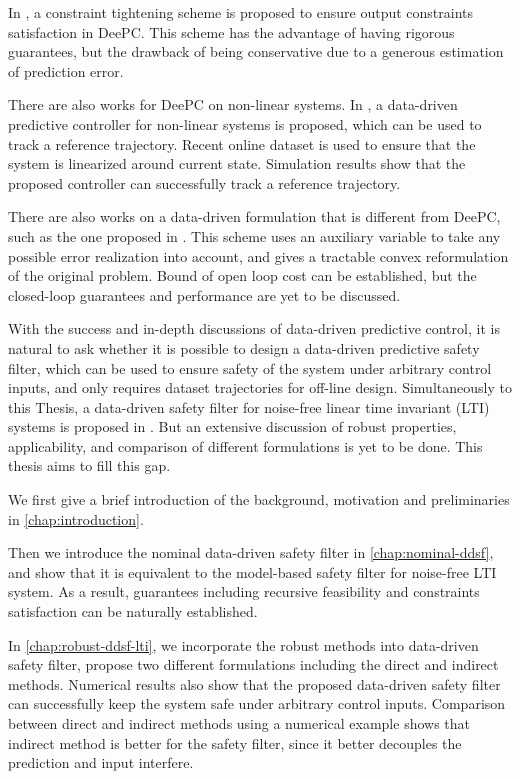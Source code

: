 In \cite{berberichRobustConstraintSatisfaction2020}, a constraint tightening scheme is proposed to ensure output constraints satisfaction in DeePC.
This scheme has the advantage of having rigorous guarantees, but the drawback of being conservative due to a generous estimation of prediction error.

There are also works for DeePC on non-linear systems.
In \cite{berberichLinearTrackingMPCData2022}, a data-driven predictive controller for non-linear systems is proposed, which can be used to track a reference trajectory.
Recent online dataset is used to ensure that the system is linearized around current state.
Simulation results show that the proposed controller can successfully track a reference trajectory.

There are also works on a data-driven formulation that is different from DeePC, such as the one proposed in \cite{huangRobustDataEnabledPredictive2023}.
This scheme uses an auxiliary variable to take any possible error realization into account, and gives a tractable convex reformulation of the original problem.
Bound of open loop cost can be established, but the closed-loop guarantees and performance are yet to be discussed.

With the success and in-depth discussions of data-driven predictive control, it is natural to ask whether it is possible to design a data-driven predictive safety filter, which can be used to ensure safety of the system under arbitrary control inputs, and only requires dataset trajectories for off-line design.
Simultaneously to this Thesis, a data-driven safety filter for noise-free linear time invariant (LTI) systems is proposed in \cite{bajelaniDataDrivenSafetyFilter2023}.
But an extensive discussion of robust properties, applicability, and comparison of different formulations is yet to be done.
This thesis aims to fill this gap.

We first give a brief introduction of the background, motivation and preliminaries in \cref{chap:introduction}.

Then we introduce the nominal data-driven safety filter in \cref{chap:nominal-ddsf}, and show that it is equivalent to the model-based safety filter for noise-free LTI system.
As a result, guarantees including recursive feasibility and constraints satisfaction can be naturally established.

In \cref{chap:robust-ddsf-lti}, we incorporate the robust methods into data-driven safety filter, propose two different formulations including the direct and indirect methods.
Numerical results also show that the proposed data-driven safety filter can successfully keep the system safe under arbitrary control inputs.
Comparison between direct and indirect methods using a numerical example shows that indirect method is better for the safety filter, since it better decouples the prediction and input interfere.

